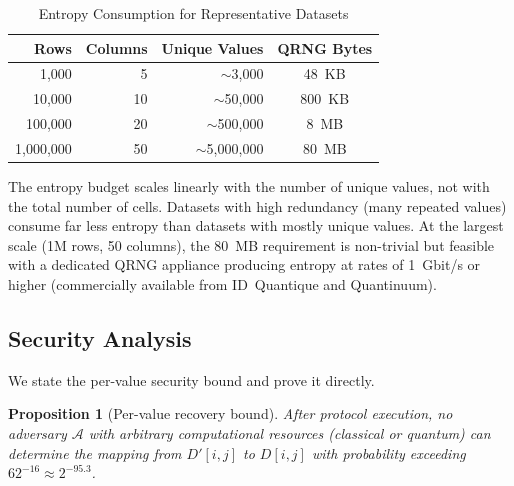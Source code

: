 \documentclass[journal]{IEEEtran}
\newtheorem{proposition}[theorem]{Proposition}
\begin{document}
\begin{table}[t]
\caption{Entropy Consumption for Representative Datasets}
\label{tab:entropy_budget}
\begin{center}
\begin{tabular}{@{}rrrc@{}}
\toprule
\textbf{Rows} & \textbf{Columns} & \textbf{Unique Values} & \textbf{QRNG Bytes} \\
\midrule
1,000 & 5 & ${\sim}$3,000 & 48~KB \\
10,000 & 10 & ${\sim}$50,000 & 800~KB \\
100,000 & 20 & ${\sim}$500,000 & 8~MB \\
1,000,000 & 50 & ${\sim}$5,000,000 & 80~MB \\
\bottomrule
\end{tabular}
\end{center}
\end{table}

The entropy budget scales linearly with the number of unique values, not with the total number of cells. Datasets with high redundancy (many repeated values) consume far less entropy than datasets with mostly unique values. At the largest scale (1M rows, 50 columns), the 80~MB requirement is non-trivial but feasible with a dedicated QRNG appliance producing entropy at rates of 1~Gbit/s or higher (commercially available from ID~Quantique and Quantinuum).

\subsection{Security Analysis}
\label{subsec:security}

We state the per-value security bound and prove it directly.

\begin{proposition}[Per-value recovery bound]
\label{prop:pervalue}
After protocol execution, no adversary $\mathcal{A}$ with arbitrary computational resources (classical or quantum) can determine the mapping from $D'[i,j]$ to $D[i,j]$ with probability exceeding $62^{-16} \approx 2^{-95.3}$.
\end{proposition}
\end{document}
